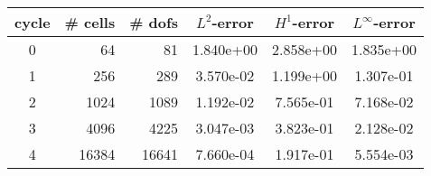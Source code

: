 \documentclass[10pt]{report}
\begin{document}
\begin{table}[H]
\begin{center}
\begin{tabular}{|c|r|r|c|c|c|} \hline
cycle & \# cells & \# dofs & $L^2$-error & $H^1$-error & $L^\infty$-error\\ \hline
0 & 64 & 81 & 1.840e+00 & 2.858e+00 & 1.835e+00\\ \hline
1 & 256 & 289 & 3.570e-02 & 1.199e+00 & 1.307e-01\\ \hline
2 & 1024 & 1089 & 1.192e-02 & 7.565e-01 & 7.168e-02\\ \hline
3 & 4096 & 4225 & 3.047e-03 & 3.823e-01 & 2.128e-02\\ \hline
4 & 16384 & 16641 & 7.660e-04 & 1.917e-01 & 5.554e-03\\ \hline
\end{tabular}
\end{center}
\end{table}
\end{document}
